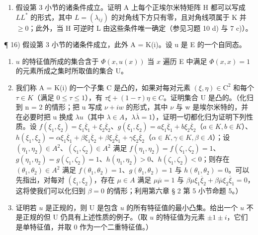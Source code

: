 \begin{enumerate}
\def\labelenumi{\arabic{enumi})}
\setcounter{enumi}{14}
\tightlist
\item
  假设第 3 小节的诸条件成立。证明 A 上每个正埃尔米特矩阵 H 都可以写成 \(LL^{*}\) 的形式，其中 \(L = (\lambda_{ij})\) 的对角线下方只有零，且对角线项属于 K 并 \(\geqslant 0\)；此外，当 H 可逆时 L 由这些条件唯一确定（参见习题 10 d) 与 7 c)）。
\end{enumerate}

¶ 16) 假设第 3 小节的诸条件成立，此外 A = K(i)。设 u 是 E 的一个自同态。

\begin{enumerate}
\def\labelenumi{\alph{enumi})}
\item
  \(u\) 的特征值所成的集合含于 \(\Phi(x, u(x))\) 当 \(x\) 遍历 E 中满足 \(\Phi(x, x) = 1\) 的元素所成之集时所取值的集合 U。
\item
  我们称 A = K(i) 的一个子集 C 是凸的，如果对每对元素 \((\xi, \eta) \in \mathrm{C}^{2}\) 和每个 \(\tau \in K\)（满足 \(0 \leqslant \tau \leqslant 1\)），有 \(\tau\xi + (1 - \tau)\eta \in C\)。证明集合 U 是凸的。（化归到 n = 2 的情形；把 u 写成 \(\nu + iw\) 的形式，其中 \(\nu\) 与 w 是埃尔米特的，并在必要时把 u 换成 \(\lambda u\)（其中 \(\lambda \in A\)，\(\lambda\overline{\lambda} = 1\)），证明一切都化归为证明下列性质。设 \(f(\xi_{1}, \xi_{2}) = \xi_{1}\overline{\xi}_{1} + \xi_{2}\overline{\xi}_{2}\)、\(g(\xi_{1}, \xi_{2}) = a\xi_{1}\overline{\xi}_{1} + b\xi_{2}\overline{\xi}_{2}\)（\(a \in K, b \in K\)）、\(h(\xi_{1}, \xi_{2}) = \alpha\xi_{1}\overline{\xi}_{1} + \beta\xi_{1}\overline{\xi}_{2} + \beta\xi_{2}\overline{\xi}_{1} + \gamma\xi_{2}\overline{\xi}_{2}\)（\(\alpha \in K, \gamma \in K, \beta \in A\)）；设 \((\eta_{1}, \eta_{2}) \in A^{2}\)、\((\zeta_{1}, \zeta_{2}) \in A^{2}\) 满足 \(f(\eta_{1}, \eta_{2}) = f(\zeta_{1}, \zeta_{2}) = 1\)、\(g(\eta_{1}, \eta_{2}) = g(\zeta_{1}, \zeta_{2}) = 1\)、\(h(\eta_{1}, \eta_{2}) > 0\)、\(h(\zeta_{1}, \zeta_{2}) < 0\)；则存在 \((\theta_{1}, \theta_{2}) \in A^{2}\) 满足 \(f(\theta_{1}, \theta_{2}) = 1\)、\(g(\theta_{1}, \theta_{2}) = 1\) 与 \(h(\theta_{1}, \theta_{2}) = 0\)。可以先指出，对每对 \((\xi_{1}, \xi_{2})\)，存在 \(\mu \in A\) 满足 \(\mu\overline{\mu} = 1\) 与 \(\beta\mu\xi_{1}\overline{\xi}_{2} + \beta\overline{\mu}\xi_{2}\overline{\xi}_{1} = 0\)，这将使我们可以化归到 \(\beta = 0\) 的情形；利用第六章 § 2 第 5 小节命题 5。）
\item
  证明若 \(u\) 是正规的，则 U 是包含 \(u\) 的所有特征值的最小凸集。给出一个 \(u\) 不是正规的但 U 仍具有上述性质的例子。（取 \(u\) 的特征值为元素 \(\pm 1 \pm i\)，它们是单特征值，并取 0 作为一个二重特征值。）
\end{enumerate}

